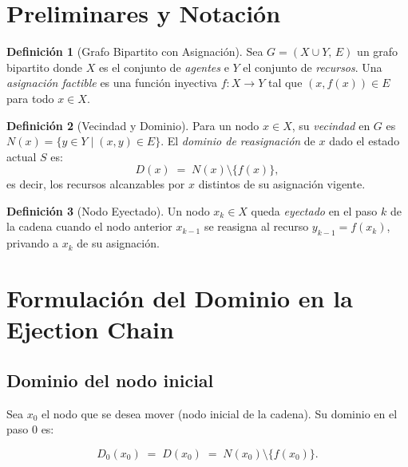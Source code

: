\documentclass[12pt, a4paper]{article}
\theoremstyle{definition}
\newtheorem{definition}{Definición}[section]
\theoremstyle{plain}
\theoremstyle{remark}
\newcommand{\dom}[1]{D\!\left(#1\right)}
\newcommand{\domk}[2]{D_{#1}\!\left(#2\right)}
\newcommand{\Nset}[1]{N\!\left(#1\right)}
\begin{document}
\section{Preliminares y Notación}

\begin{definition}[Grafo Bipartito con Asignación]
  Sea $G = (X \cup Y,\, E)$ un grafo bipartito donde $X$ es el conjunto de
  \emph{agentes} e $Y$ el conjunto de \emph{recursos}.  Una
  \emph{asignación factible} es una función inyectiva $f: X \to Y$ tal que
  $(x, f(x)) \in E$ para todo $x \in X$.
\end{definition}

\begin{definition}[Vecindad y Dominio]
  Para un nodo $x \in X$, su \emph{vecindad} en $G$ es
  $\Nset{x} = \{y \in Y \mid (x,y) \in E\}$.
  El \emph{dominio de reasignación} de $x$ dado el estado actual $S$ es:
  \[
    \dom{x} \;=\; \Nset{x} \setminus \{f(x)\},
  \]
  es decir, los recursos alcanzables por $x$ distintos de su asignación
  vigente.
\end{definition}

\begin{definition}[Nodo Eyectado]
  Un nodo $x_k \in X$ queda \emph{eyectado} en el paso $k$ de la cadena
  cuando el nodo anterior $x_{k-1}$ se reasigna al recurso $y_{k-1} = f(x_k)$,
  privando a $x_k$ de su asignación.
\end{definition}

\section{Formulación del Dominio en la Ejection Chain}

\subsection{Dominio del nodo inicial}

Sea $x_0$ el nodo que se desea mover (nodo inicial de la cadena).  Su dominio
en el paso $0$ es:

\begin{equation}
  \domk{0}{x_0} \;=\; \dom{x_0} \;=\; \Nset{x_0} \setminus \{f(x_0)\}.
  \label{eq:dom0}
\end{equation}
\end{document}
